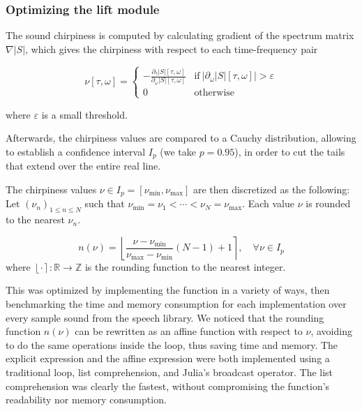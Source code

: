 \documentclass[american,]{article}
\theoremstyle{definition}
\theoremstyle{definition}
\theoremstyle{definition}
\theoremstyle{remark}
\begin{document}
\hypertarget{optimizing-the-lift-module}{%
\subsubsection{Optimizing the lift module}\label{optimizing-the-lift-module}}

The sound chirpiness is computed by calculating gradient of the spectrum matrix \(\nabla\left\lvert S\right\rvert\),
which gives the chirpiness with respect to each time-frequency pair

\begin{equation}
\nu[\tau,\omega] =
\begin{cases}
-\frac{\partial_\tau\left\lvert S\right\rvert[\tau,\omega]}{\partial_\omega\left\lvert S\right\rvert[\tau,\omega]} & \text{if}~\left\lvert\partial_\omega\left\lvert S\right\rvert[\tau,\omega]\right\rvert>\varepsilon\\
0 & \text{otherwise}
\end{cases}
\end{equation}

where \(\varepsilon\) is a small threshold.

Afterwards, the chirpiness values are compared to a Cauchy distribution, allowing to establish
a confidence interval \(I_p\) (we take \(p=0.95\)), in order to cut the tails that extend
over the entire real line.

The chirpiness values \(\nu\in I_p=[\nu_{\min},\nu_{\max}]\) are then discretized as the following:
Let \((\nu_n)_{1\leq n\leq N}\) such that \(\nu_{\min}=\nu_1<\cdots<\nu_N=\nu_{\max}\).
Each value \(\nu\) is rounded to the nearest \(\nu_n\).

\begin{equation}
n(\nu) = \left\lfloor\frac{\nu - \nu_{\min}}{\nu_{\max}- \nu_{\min}}(N-1) + 1\right\rceil,\quad\forall\nu\in I_p
\end{equation}
where \(\left\lfloor\cdot\right\rceil:\mathbb{R}\rightarrow\mathbb{Z}\) is the rounding function to the nearest integer.

This was optimized by implementing the function in a variety of ways,
then benchmarking the time and memory consumption for each implementation
over every sample sound from the speech library.
We noticed that the rounding function \(n(\nu)\) can be rewritten
as an affine function with respect to \(\nu\), avoiding to do the same
operations inside the loop, thus saving time and memory.
The explicit expression and the affine expression were both implemented
using a traditional loop, list comprehension, and Julia's broadcast operator.
The list comprehension was clearly the fastest, without compromising
the function's readability nor memory consumption.
\end{document}
